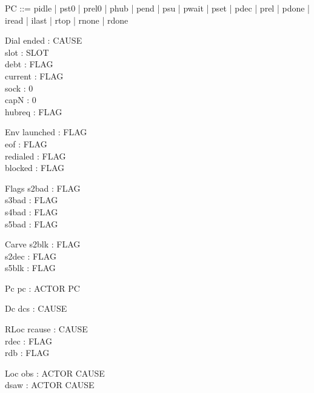 \documentclass[a4paper,10pt,fleqn]{article}
\begin{document}
\begin{zed}
  PC ::= pidle | pst0 | prel0 | phub | pend | psu | pwait | pset | pdec | prel |
    pdone | iread | ilast | rtop | rnone | rdone
\end{zed}

\begin{schema}{Dial}
  ended : CAUSE \\
  slot : SLOT \\
  debt : FLAG \\
  current : FLAG \\
  sock : 0  \\
  capN : 0  \\
  hubreq : FLAG
\end{schema}

\begin{schema}{Env}
  launched : FLAG \\
  eof : FLAG \\
  redialed : FLAG \\
  blocked : FLAG
\end{schema}

\begin{schema}{Flags}
  s2bad : FLAG \\
  s3bad : FLAG \\
  s4bad : FLAG \\
  s5bad : FLAG
\end{schema}

\begin{schema}{Carve}
  s2blk : FLAG \\
  s2dec : FLAG \\
  s5blk : FLAG
\end{schema}

\begin{schema}{Pc}
  pc : ACTOR \fun PC
\end{schema}

\begin{schema}{Dc}
  dcs : CAUSE
\end{schema}

\begin{schema}{RLoc}
  rcause : CAUSE \\
  rdec : FLAG \\
  rdb : FLAG
\end{schema}

\begin{schema}{Loc}
  obs : ACTOR \fun CAUSE \\
  dsaw : ACTOR \fun CAUSE
\end{schema}
\end{document}
